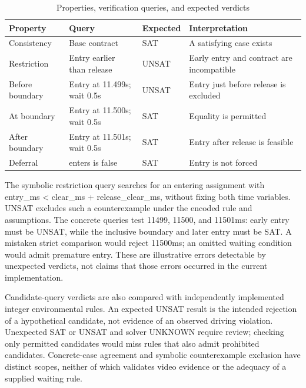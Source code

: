 \documentclass[nolineno]{ieeeaccess}
\begin{document}
\begin{table}[tp]\caption{Properties, verification queries, and expected verdicts}\label{tab:properties}
\centering\fontsize{8}{10}\selectfont\setlength{\tabcolsep}{3pt}
\begin{tabular}{@{}>{\raggedright\arraybackslash}p{}>{\raggedright\arraybackslash}p{}>{\raggedright\arraybackslash}p{}>{\raggedright\arraybackslash}p{}@{}}
\toprule
\textbf{Property} & \textbf{Query} & \textbf{Expected} & \textbf{Interpretation}\\
\midrule
Consistency & Base contract & SAT & A satisfying case exists\\[3pt]
Restriction & Entry earlier than release & UNSAT & Early entry and contract are incompatible\\[3pt]
Before boundary & Entry at 11.499s; wait 0.5s & UNSAT & Entry just before release is excluded\\[3pt]
At boundary & Entry at 11.500s; wait 0.5s & SAT & Equality is permitted\\[3pt]
After boundary & Entry at 11.501s; wait 0.5s & SAT & Entry after release is feasible\\[3pt]
Deferral & enters is false & SAT & Entry is not forced\\[3pt]
\bottomrule\end{tabular}
\end{table}

The symbolic restriction query searches for an entering assignment with {\ttfamily{}\selectfont\footnotesize entry\_\allowbreak ms < clear\_\allowbreak ms + release\_\allowbreak clear\_\allowbreak ms}, without fixing both time variables. UNSAT excludes such a counterexample under the encoded rule and assumptions. The concrete queries test 11499, 11500, and 11501ms: early entry must be UNSAT, while the inclusive boundary and later entry must be SAT. A mistaken strict comparison would reject 11500ms; an omitted waiting condition would admit premature entry. These are illustrative errors detectable by unexpected verdicts, not claims that those errors occurred in the current implementation.\par

Candidate-query verdicts are also compared with independently implemented integer environmental rules. An expected UNSAT result is the intended rejection of a hypothetical candidate, not evidence of an observed driving violation. Unexpected SAT or UNSAT and solver UNKNOWN require review; checking only permitted candidates would miss rules that also admit prohibited candidates. Concrete-case agreement and symbolic counterexample exclusion have distinct scopes, neither of which validates video evidence or the adequacy of a supplied waiting rule.\par
\end{document}

